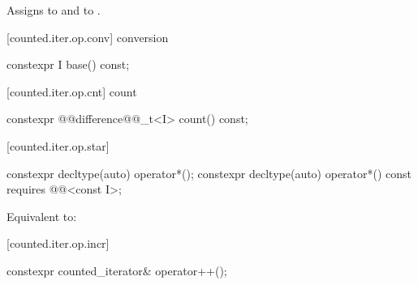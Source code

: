 \begin{addedblock}
\begin{itemdescr}
\pnum
\effects Assigns  to
 and  to .
\end{itemdescr}

[counted.iter.op.conv]{ conversion}

%
%
\begin{itemdecl}
constexpr I base() const;
\end{itemdecl}

\begin{itemdescr}
\pnum
{}

\pnum
{}
\end{itemdescr}

[counted.iter.op.cnt]{ count}

%
%
\begin{itemdecl}
constexpr @@difference@@_t<I> count() const;
\end{itemdecl}

\begin{itemdescr}
\pnum
{}

\pnum
{}
\end{itemdescr}

[counted.iter.op.star]{}

%
%
\begin{itemdecl}
constexpr decltype(auto) operator*();
constexpr decltype(auto) operator*() const
  requires @@<const I>;
\end{itemdecl}

\begin{itemdescr}
\pnum
\effects Equivalent to:
\end{itemdescr}

[counted.iter.op.incr]{}

%
%
\begin{itemdecl}
constexpr counted_iterator& operator++();
\end{itemdecl}


\end{addedblock}
